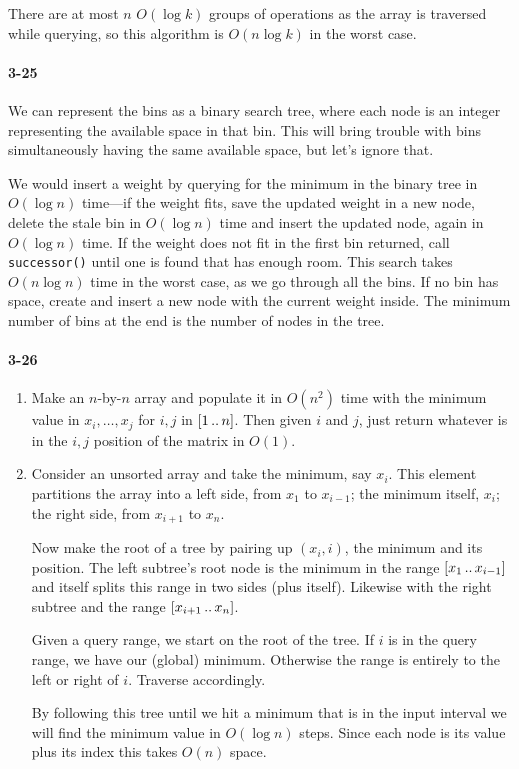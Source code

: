 \documentclass{report}
\newcommand{\ldotsTwo}{%
  \mathinner{{\ldotp}{\ldotp}}%
}
\begin{document}
There are at most $n$ $O(\log k)$ groups of operations as the array is traversed while querying, so this algorithm is $O(n\log k)$ in the worst case.

\paragraph{3-25} We can represent the bins as a binary search tree, where each node is an integer representing the available space in that bin. This will bring trouble with bins simultaneously having the same available space, but let's ignore that.

We would insert a weight by querying for the minimum in the binary tree in $O(\log n)$ time---if the weight fits, save the updated weight in a new node, delete the stale bin in $O(\log n)$ time and insert the updated node, again in $O(\log n)$ time. If the weight does not fit in the first bin returned, call \lstinline!successor()! until one is found that has enough room. This search takes $O(n\log n)$ time in the worst case, as we go through all the bins. If no bin has space, create and insert a new node with the current weight inside. The minimum number of bins at the end is the number of nodes in the tree.

\paragraph{3-26}
\begin{enumerate}[label=\alph*)]
	\item Make an $n$-by-$n$ array and populate it in $O(n^2)$ time with the minimum value in $x_i,\ldots,x_j$ for $i,j$ in $[1\ldotsTwo n]$. Then given $i$ and $j$, just return whatever is in the $i,j$ position of the matrix in $O(1)$.
	\item Consider an unsorted array and take the minimum, say $x_i$. This element partitions the array into a left side, from $x_1$ to $x_{i-1}$; the minimum itself, $x_i$; the right side, from $x_{i+1}$ to $x_n$.

	Now make the root of a tree by pairing up $(x_i, i)$, the minimum and its position. The left subtree's root node is the minimum in the range $[x_1\ldotsTwo x_{i-1}]$ and itself splits this range in two sides (plus itself). Likewise with the right subtree and the range $[x_{i+1}\ldotsTwo x_n]$.

	Given a query range, we start on the root of the tree. If $i$ is in the query range, we have our (global) minimum. Otherwise the range is entirely to the left or right of $i$. Traverse accordingly.

	By following this tree until we hit a minimum that is in the input interval we will find the minimum value in $O(\log n)$ steps. Since each node is its value plus its index this takes $O(n)$ space.
\end{enumerate}
\end{document}
